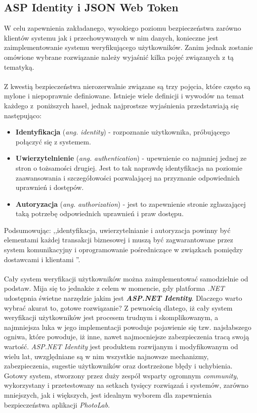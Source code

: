 \subsection{ASP Identity i JSON Web Token}
\quad W celu zapewnienia zakładanego, wysokiego poziomu bezpieczeństwa zarówno klientów systemu jak i przechowywanych w nim danych, konieczne jest zaimplementowanie systemu weryfikującego użytkowników. Zanim jednak zostanie omówione wybrane rozwiązanie należy wyjaśnić kilka pojęć związanych z tą tematyką.\\
    \\
    Z kwestią bezpieczeństwa nierozerwalnie związane są trzy pojęcia, które często są mylone i niepoprawnie definiowane. Istnieje wiele definicji i wywodów na temat każdego z~poniższych haseł, jednak najprostsze wyjaśnienia przedstawiają się następująco:
    \begin{itemize}
        \item \textbf{Identyfikacja} (\textit{ang. identity}) - rozpoznanie użytkownika, próbującego połączyć się z systemem.
        \item \textbf{Uwierzytelnienie} (\textit{ang. authentication}) - upewnienie co najmniej jednej ze stron o tożsamości drugiej. Jest to tak naprawdę identyfikacja na poziomie zaawansowania i szczegółowości pozwalającej na przyznanie odpowiednich uprawnień i dostępów.
        \item \textbf{Autoryzacja} (\textit{ang. authorization}) - jest to zapewnienie stronie zgłaszającej taką potrzebę odpowiednich uprawnień i praw dostępu. 
    \end{itemize}
    Podsumowując: ,,identyfikacja, uwierzytelnianie i autoryzacja powinny być elementami każdej transakcji biznesowej i muszą być zagwarantowane przez system komunikacyjny i oprogramowanie pośredniczące w związkach pomiędzy dostawcami i klientami \cite{identity-theory}''. \\
    \\
    Cały system weryfikacji użytkowników można zaimplementować samodzielnie od podstaw. Mija się to jednakże z celem w momencie, gdy platforma \textit{.NET} udostępnia świetne narzędzie jakim jest \textbf{\textit{ASP.NET Identity}}. Dlaczego warto wybrać akurat to, gotowe rozwiązanie? Z pewnością dlatego, iż cały system weryfikacji użytkowników jest procesem trudnym i skomplikowanym, a najmniejsza luka w jego implementacji powoduje pojawienie się tzw. najsłabszego ogniwa, które powoduje, iż inne, nawet najmocniejsze zabezpieczenia tracą swoją wartość. \textit{ASP.NET Identity} jest produktem rozwijanym i modyfikowanym od wielu lat, uwzględniane są w nim wszystkie najnowsze mechanizmy, zabezpieczenia, sugestie użytkowników oraz dostrzeżone błędy i uchybienia. Gotowy system, stworzony przez duży zespół wsparty ogromnym \textit{community}, wykorzystany i przetestowany na setkach tysięcy rozwiązań i systemów, zarówno mniejszych, jak i większych, jest idealnym wyborem dla zapewnienia bezpieczeństwa aplikacji \textit{PhotoLab}.\\
